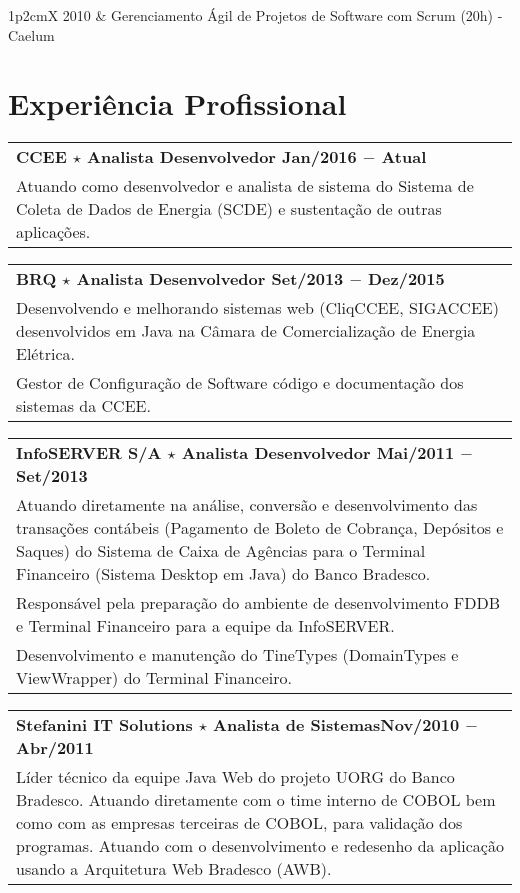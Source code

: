 \documentclass[a4paper, oneside, final]{scrartcl}
\newcommand{\vspc}{\vspace{0.15cm}} %
\begin{document}
\begin{center}
\begin{tabularx}{1\linewidth}{p{2cm}X}
2010       & Gerenciamento Ágil de Projetos de Software com Scrum (20h) - Caelum
\end{tabularx}

\section{Experiência Profissional}
\begin{tabularx}{1\linewidth}{X}
{\bf CCEE $\star$ Analista Desenvolvedor \hfill Jan/2016 $-$ Atual} \\
Atuando como desenvolvedor e analista de sistema do Sistema de Coleta de Dados de Energia (SCDE) e sustentação de outras aplicações. \vspc\\
\end{tabularx}

\begin{tabularx}{1\linewidth}{X}
{\bf BRQ $\star$ Analista Desenvolvedor \hfill Set/2013 $-$ Dez/2015} \\
Desenvolvendo e melhorando sistemas web (CliqCCEE, SIGACCEE) desenvolvidos em Java na Câmara de Comercialização de Energia Elétrica. \vspc\\
Gestor de Configuração de Software código e documentação dos sistemas da CCEE. \vspc\\
\end{tabularx}

\begin{tabularx}{1\linewidth}{X}
{\bf InfoSERVER S/A $\star$ Analista Desenvolvedor \hfill Mai/2011 $-$ Set/2013} \\
Atuando diretamente na análise, conversão e desenvolvimento das transações contábeis (Pagamento de
Boleto de Cobrança, Depósitos e Saques) do Sistema de Caixa de Agências para o Terminal Financeiro (Sistema
Desktop em Java) do Banco Bradesco.\vspc\\
Responsável pela preparação do ambiente de desenvolvimento FDDB e Terminal Financeiro para a equipe da
InfoSERVER. \vspc\\
Desenvolvimento e manutenção do TineTypes (DomainTypes e ViewWrapper) do Terminal Financeiro.  \vspc\\
\end{tabularx}

\begin{tabularx}{1\linewidth}{X}
{\bf Stefanini IT Solutions $\star$ Analista de Sistemas\hfill Nov/2010 $-$ Abr/2011} \\
Líder técnico da equipe Java Web do projeto UORG do Banco Bradesco. Atuando diretamente com o time
interno de COBOL bem como com as empresas terceiras de COBOL, para validação dos programas. Atuando
com o desenvolvimento e redesenho da aplicação usando a Arquitetura Web Bradesco (AWB).\vspc\\
\end{tabularx}


\end{center}
\end{document}
